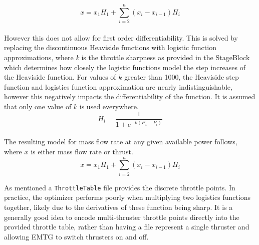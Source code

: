 {\begin{equation}
        x = x_1 H_1 + \sum_{i=2}^{n}\left(x_i - x_{i-1}\right) H_i
    \end{equation} \\
    However this does not allow for first order differentiability. This is solved by replacing the discontinuous Heaviside functions with logistic function approximations, where {\it k} is the throttle sharpness as provided in the StageBlock which determines how closely the logistic functions model the step increases of the Heaviside function. For values of $k$ greater than 1000, the Heaviside step function and logistics function approximation are nearly indistinguishable, however this negatively impacts the differentiability of the function. It is assumed that only one value of $k$ is used everywhere.
    \begin{equation}
        \bar{H}_i = \frac{1}{1 + e^{-k (P_a - P_i)}}
    \end{equation} \\
    The resulting model for mass flow rate at any given available power follows, where $x$ is either mass flow rate or thrust.
    \begin{equation}
        x = x_1 \bar{H}_1 + \sum_{i=2}^{n}\left(x_i - x_{i-1}\right) \bar{H}_i
    \end{equation}

    As mentioned a {\tt ThrottleTable} file provides the discrete throttle points. In practice, the optimizer performs poorly when multiplying two logistics functions together, likely due to the derivatives of these function being sharp. It is a generally good idea to encode multi-thruster throttle points directly into the provided throttle table, rather than having a file represent a single thruster and allowing \ac{EMTG} to switch thrusters on and off.
    }


